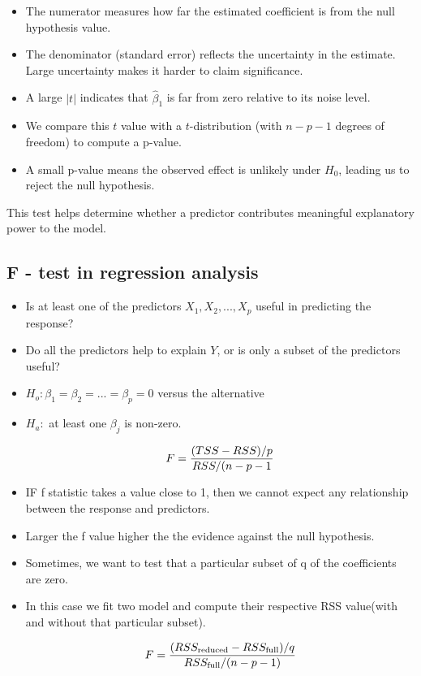 \documentclass[11pt,a4paper]{article}
\begin{document}
\begin{itemize}
    \item The numerator measures how far the estimated coefficient is from the null hypothesis value.
    \item The denominator (standard error) reflects the uncertainty in the estimate.  
          Large uncertainty makes it harder to claim significance.
    \item A large $|t|$ indicates that $\hat{\beta}_1$ is far from zero relative to its noise level.
    \item We compare this $t$ value with a $t$-distribution (with $n - p - 1$ degrees of freedom) to compute a p-value.
    \item A small p-value means the observed effect is unlikely under $H_0$, leading us to reject the null hypothesis.
\end{itemize}

This test helps determine whether a predictor contributes meaningful explanatory power to the model.



\subsection{F - test in regression analysis}
\begin{itemize}
\item Is at least one of the predictors $X_1,X_2,...,X_p$ useful in predicting the response?
\item Do all the predictors help to explain $Y$, or is only a subset of the predictors useful?
\item $H_o : \beta_1 = \beta_2 = ... = \beta_p = 0$ versus the alternative
\item $H_a :$ at least one $\beta_j$ is non-zero.

\begin{align*}
\Large F = \frac{(TSS-RSS)/p}{RSS/(n-p-1}
\end{align*}

\item IF f statistic takes a value close to 1, then we cannot expect any relationship between the response and predictors.
\item Larger the f value higher the the evidence against the null hypothesis.

\item Sometimes, we want to test that a particular subset of q of the coefficients are zero.
\item In this case we fit two model and compute their respective RSS value(with and without that particular subset).

\begin{align*}
\Large F = \frac{ (RSS_{\text{reduced}} - RSS_{\text{full}}) / q }{ RSS_{\text{full}} / (n - p - 1) }
\end{align*}

\end{itemize}
\end{document}
